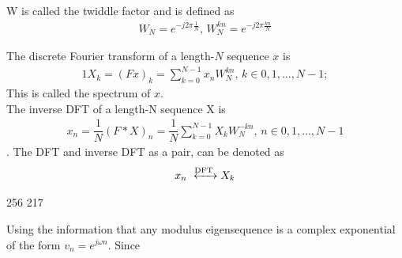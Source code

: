 W is called the twiddle factor and is defined as 
\begin{align*}
	W_N = e^{-j 2 \pi\frac{1}{N}}, \, W_N^{kn} = e^{-j 2 \pi\frac{kn}{N}}
\end{align*}

\begin{definition}
The discrete Fourier transform of a length-$N$ sequence $x$ is 
\begin{align*}1
	X_k = (Fx)_k = \sum_{k=0}^{N-1} x_n W_N^{kn}, \, k\in {0, 1, \dots, N-1};
\end{align*}
This is called the spectrum of $x$.\\
The inverse DFT of a length-N sequence X is
\begin{align*}
	x_n = \dfrac{1}{N}(F*X)_n = \dfrac{1}{N}\sum_{k=0}^{N-1} X_k W_N^{-kn}, \, n \in {0, 1, \dots, N-1}
\end{align*}
.
The DFT and inverse DFT as a pair, can be denoted as 
\begin{align*}
	x_n \xleftrightarrow{\text{DFT}} X_k
\end{align*}
\end{definition} 
\cite{FSP}



256 217

Using the information that any modulus eigensequence is a complex exponential of the form $v_n = e^{j\omega n}$.
Since